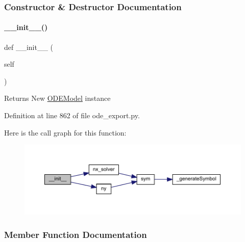 \subsubsection{Constructor \& Destructor Documentation}
\mbox{\label{classamici_1_1ode__export_1_1_o_d_e_model_ae64f0875afe3067b97ba370b354b9213}} 
\paragraph{\texorpdfstring{\_\_init\_\_()}{\_\_init\_\_()}}
{\footnotesize\ttfamily def \+\_\+\+\_\+init\+\_\+\+\_\+ (\begin{DoxyParamCaption}\item[{}]{self }\end{DoxyParamCaption})}

\begin{DoxyReturn}{Returns}
New \mbox{\hyperlink{classamici_1_1ode__export_1_1_o_d_e_model}{O\+D\+E\+Model}} instance 
\end{DoxyReturn}


Definition at line 862 of file ode\+\_\+export.\+py.

Here is the call graph for this function\+:
\nopagebreak
\begin{figure}[H]
\begin{center}
\leavevmode
\includegraphics[width=350pt]{classamici_1_1ode__export_1_1_o_d_e_model_ae64f0875afe3067b97ba370b354b9213_cgraph}
\end{center}
\end{figure}


\subsubsection{Member Function Documentation}
\mbox{\label{classamici_1_1ode__export_1_1_o_d_e_model_a3a3ebfdaf0d1f08adf028afb10d5b5c1}} 
